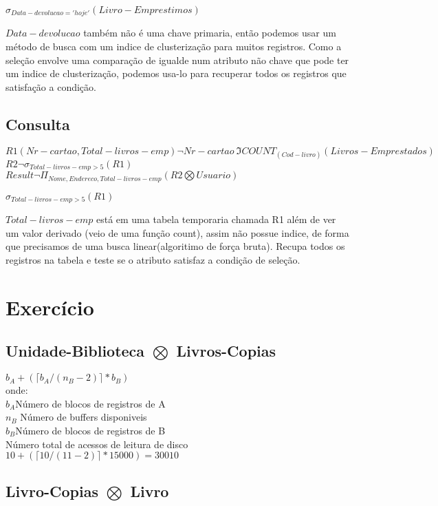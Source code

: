 \documentclass[a4paper,10pt]{article}
\begin{document}
$\sigma_{Data-devolucao='hoje'}(Livro-Emprestimos)$

$Data-devolucao$ também não é uma chave primaria, então podemos usar um método de busca com um indice de clusterização para muitos registros. Como a seleção envolve uma comparação de igualde num atributo não chave que pode ter um indice de clusterização, podemos usa-lo para recuperar todos os registros que satisfação a condição.

\subsection{Consulta}

$R1(Nr-cartao,Total-livros-emp) \neg Nr-cartao\ \Im COUNT_{(Cod-livro)}(Livros-Emprestados)$\\
$R2 \neg \sigma_{Total-livros-emp>5}(R1)$\\
$Result \neg \Pi_{Nome,Endereco,Total-livros-emp} (R2 \bigotimes Usuario) $

$\sigma_{Total-livros-emp>5}(R1)$

$Total-livros-emp$ está em uma tabela temporaria chamada R1 além de ver um valor derivado (veio de uma função count), assim não possue indice, de forma que precisamos de uma busca linear(algoritimo de força bruta). Recupa todos os registros na tabela e teste se o atributo satisfaz a condição de seleção.

\section{Exercício}

\subsection{Unidade-Biblioteca $\bigotimes$ Livros-Copias}

$b_A+(\lceil b_A/(n_B-2)\rceil * b_B)$\\
onde:\\
$b_A$Número de blocos de registros de A\\
$n_B$ Número de buffers disponiveis\\
$b_B$Número de blocos de registros de B\\

Número total de acessos de leitura de disco\\
$10 + (\lceil 10/(11-2) \rceil * 15000) = 30010$\\

\subsection{Livro-Copias $\bigotimes$ Livro}
\end{document}
